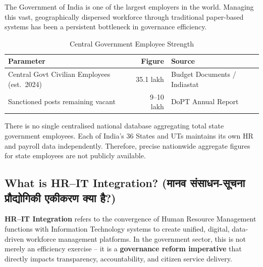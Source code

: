 \documentclass[12pt,a4paper]{article}
\newcommand{\hindi}[1]{{\hindifont #1}}
\begin{document}
The Government of India is one of the largest employers in the world. Managing this vast, geographically dispersed workforce through traditional paper-based systems has been a persistent bottleneck in governance efficiency.

\begin{table}[H]
\centering
\caption{Central Government Employee Strength}
\label{tab:workforce}
\begin{tabular}{@{}lrl@{}}
\toprule
\textbf{Parameter} & \textbf{Figure} & \textbf{Source} \\
\midrule
Central Govt Civilian Employees (est.\ 2024) & 35.1 lakh & Budget Documents / Indiastat \\
Sanctioned posts remaining vacant & 9--10 lakh & DoPT Annual Report \\
\bottomrule
\end{tabular}
\end{table}

\begin{warningbox}
There is no single centralised national database aggregating total state government employees. Each of India's 36 States and UTs maintains its own HR and payroll data independently. Therefore, precise nationwide aggregate figures for state employees are not publicly available.
\end{warningbox}

\subsection{What is HR--IT Integration? (\hindi{मानव संसाधन-सूचना प्रौद्योगिकी एकीकरण क्या है?})}

\textbf{HR--IT Integration} refers to the convergence of Human Resource Management functions with Information Technology systems to create unified, digital, data-driven workforce management platforms. In the government sector, this is not merely an efficiency exercise -- it is a \textbf{governance reform imperative} that directly impacts transparency, accountability, and citizen service delivery.
\end{document}
